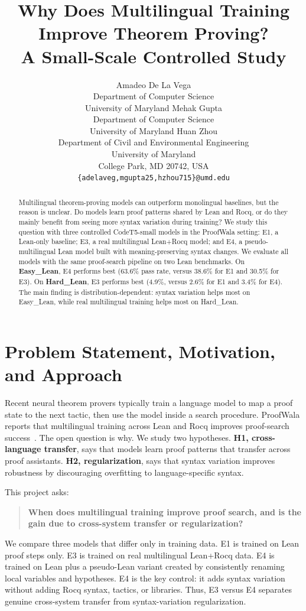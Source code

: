 \documentclass{article} %
\title{Why Does Multilingual Training Improve Theorem Proving? \\ A Small-Scale Controlled Study}
\author{
Amadeo De La Vega \\
Department of Computer Science\\
University of Maryland
\And
Mehak Gupta \\
Department of Computer Science\\
University of Maryland
\And
Huan Zhou \\
Department of Civil and Environmental Engineering\\
University of Maryland\\
College Park, MD 20742, USA\\
\texttt{\{adelaveg,mgupta25,hzhou715\}@umd.edu}
}
\begin{document}
\linenumbers


\maketitle
\nolinenumbers %

\begin{abstract}
Multilingual theorem-proving models can outperform monolingual baselines, but the reason is unclear.  Do models learn proof patterns shared by Lean and Rocq, or do they mainly benefit from seeing more syntax variation during training?  We study this question with three controlled CodeT5-small models in the ProofWala setting: E1, a Lean-only baseline; E3, a real multilingual Lean+Rocq model; and E4, a pseudo-multilingual Lean model built with meaning-preserving syntax changes.  We evaluate all models with the same proof-search pipeline on two Lean benchmarks.  On \textbf{Easy\_Lean}, E4 performs best (63.6\% pass rate, versus 38.6\% for E1 and 30.5\% for E3).  On \textbf{Hard\_Lean}, E3 performs best (4.9\%, versus 2.6\% for E1 and 3.4\% for E4).  The main finding is distribution-dependent: syntax variation helps most on Easy\_Lean, while real multilingual training helps most on Hard\_Lean.
\end{abstract}

\section{Problem Statement, Motivation, and Approach}

Recent neural theorem provers typically train a language model to map a proof state to the next tactic, then use the model inside a search procedure.  ProofWala reports that multilingual training across Lean and Rocq improves proof-search success~\citep{thakur2025proofwala}.  The open question is why.  We study two hypotheses.  \textbf{H1, cross-language transfer}, says that models learn proof patterns that transfer across proof assistants.  \textbf{H2, regularization}, says that syntax variation improves robustness by discouraging overfitting to language-specific syntax.

This project asks:

\begin{quote}
\textbf{When does multilingual training improve proof search, and is the gain due to cross-system transfer or regularization?}
\end{quote}

We compare three models that differ only in training data.  E1 is trained on Lean proof steps only.  E3 is trained on real multilingual Lean+Rocq data.  E4 is trained on Lean plus a pseudo-Lean variant created by consistently renaming local variables and hypotheses.  E4 is the key control: it adds syntax variation without adding Rocq syntax, tactics, or libraries.  Thus, E3 versus E4 separates genuine cross-system transfer from syntax-variation regularization.
\end{document}
